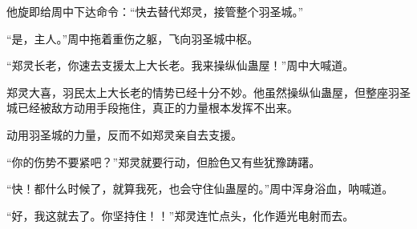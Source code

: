\begin{this_body}
他旋即给周中下达命令：“快去替代郑灵，接管整个羽圣城。”

“是，主人。”周中拖着重伤之躯，飞向羽圣城中枢。

“郑灵长老，你速去支援太上大长老。我来操纵仙蛊屋！”周中大喊道。

郑灵大喜，羽民太上大长老的情势已经十分不妙。他虽然操纵仙蛊屋，但整座羽圣城已经被敌方动用手段拖住，真正的力量根本发挥不出来。

动用羽圣城的力量，反而不如郑灵亲自去支援。

“你的伤势不要紧吧？”郑灵就要行动，但脸色又有些犹豫踌躇。

“快！都什么时候了，就算我死，也会守住仙蛊屋的。”周中浑身浴血，呐喊道。

“好，我这就去了。你坚持住！！”郑灵连忙点头，化作遁光电射而去。

\end{this_body}

